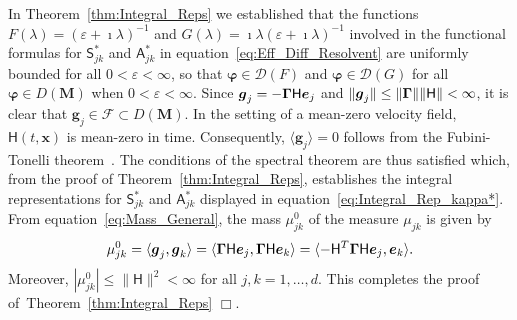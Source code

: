 \documentclass[leqno,onefignum,onetabnum]{siamltex1213}
\newcommand{\thmref}[1]{Theorem~\ref{#1}}
\newcommand{\Mb}{\mathbf{M}}
\newcommand{\Fc}{\mathcal{F}}
\newcommand{\Hm}{\mathsf{H}}
\newcommand{\Sm}{\mathsf{S}}
\newcommand{\Am}{\mathsf{A}}
\newcommand{\Ds}{\mathscr{D}}
\newcommand\bGamma{\mbox{\boldmath${\Gamma}$}}
\newcommand{\vecg}{\boldsymbol{g}}
\newcommand{\vecx}{\boldsymbol{x}}
\newcommand{\vece}{\boldsymbol{e}}
\newcommand{\vecvarphi}{\boldsymbol{\varphi}}
\begin{document}
In \thmref{thm:Integral_Reps} we established that the functions
$F(\lambda)=(\varepsilon+\imath\lambda)^{-1}$ and $G(\lambda)=\imath\lambda(\varepsilon+\imath\lambda)^{-1}$ involved in the functional
formulas for $\Sm^*_{jk}$ and $\Am^*_{jk}$ in
equation~\eqref{eq:Eff_Diff_Resolvent} are uniformly bounded for all
$0<\varepsilon<\infty$, so that $\vecvarphi\in\Ds(F)$ and $\vecvarphi\in\Ds(G)$ for all
$\vecvarphi\in D(\Mb)$ when $0<\varepsilon<\infty$.  Since $\vecg_j=-\bGamma\Hm\vece_j$
and $\|\vecg_j\|\leq\|\bGamma\|\|\Hm\|<\infty$, it is clear that $\vecg_j\in\Fc\subset
D(\Mb)$. In the setting of a mean-zero velocity field, $\Hm(t,\vecx)$
is mean-zero in time. Consequently, $\langle\vecg_j\rangle=0$ follows from the
Fubini-Tonelli theorem~\cite{Folland:99:RealAnalysis}. The conditions
of the spectral theorem are thus satisfied which, from the proof of
\thmref{thm:Integral_Reps}, establishes the integral representations
for $\Sm^*_{jk}$ and $\Am^*_{jk}$ displayed in
equation~\eqref{eq:Integral_Rep_kappa*}. From
equation~\eqref{eq:Mass_General}, the mass $\mu_{jk}^0$ of the measure
$\mu_{jk}$ is given by
% 
\begin{align}\label{eq:Mass}
  \mu^0_{jk}   =\langle\vecg_j,\vecg_k\rangle
        =\langle\bGamma\Hm\vece_j,\bGamma\Hm\vece_k\rangle 
        =\langle-\Hm^T\bGamma\Hm\vece_j,\vece_k\rangle.     
\end{align}
%
Moreover,  $|\mu^0_{jk}|\leq\|\Hm\|^2<\infty$ for all $j,k=1,\ldots,d$.  This completes the proof
of~\thmref{thm:Integral_Reps} $\Box$.  
\end{document}
